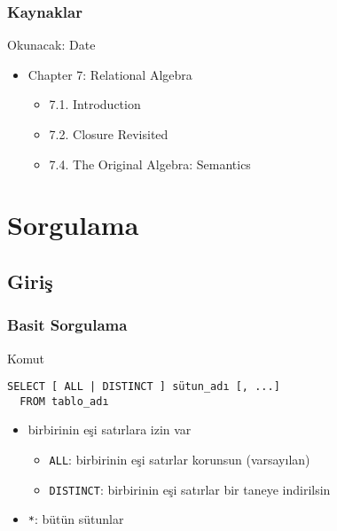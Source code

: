 \documentclass[dvipsnames]{beamer}
\theoremstyle{definition}
\theoremstyle{example}
\theoremstyle{plain}
\begin{document}
\begin{frame}
  \frametitle{Kaynaklar}

  \begin{block}{Okunacak: Date}
    \begin{itemize}
      \item Chapter 7: Relational Algebra
      \begin{itemize}
        \item 7.1. \alert{Introduction}
        \item 7.2. \alert{Closure Revisited}
        \item 7.4. \alert{The Original Algebra: Semantics}
      \end{itemize}
    \end{itemize}
  \end{block}
\end{frame}

\lstset{language=FullSQL}

\section{Sorgulama}

\subsection{Giriş}

\begin{frame}[fragile]
  \frametitle{Basit Sorgulama}

  \begin{block}{Komut}
    \begin{lstlisting}
SELECT [ ALL | DISTINCT ] sütun_adı [, ...]
  FROM tablo_adı
    \end{lstlisting}
  \end{block}

  \pause
  \begin{itemize}
    \item birbirinin eşi satırlara izin var
    \begin{itemize}
        \item \lstinline!ALL!: birbirinin eşi satırlar korunsun (varsayılan)
        \item \lstinline!DISTINCT!: birbirinin eşi satırlar bir taneye
          indirilsin
    \end{itemize}

    \item \lstinline!*!: bütün sütunlar
  \end{itemize}
\end{frame}
\end{document}
